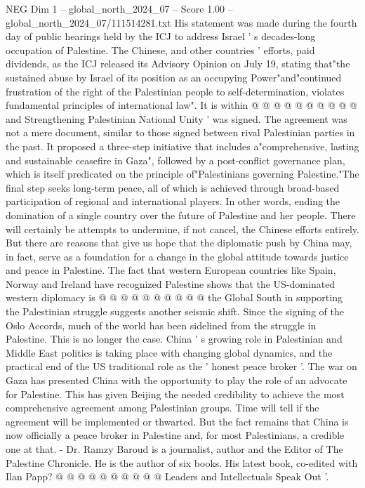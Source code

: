 \begin{textsample}{NEG Dim 1 – global\_north\_2024\_07 – Score 1.00 – global\_north\_2024\_07/111514281.txt}
His statement was made during the fourth day of public hearings held by the ICJ to address Israel ' s decades-long occupation of Palestine.
The Chinese, and other countries ' efforts, paid dividends, as the ICJ released its Advisory Opinion on July 19, stating that"the sustained abuse by Israel of its position as an occupying Power"and"continued frustration of the right of the Palestinian people to self-determination, violates fundamental principles of international law".
It is within @ @ @ @ @ @ @ @ @ @ and Strengthening Palestinian National Unity ' was signed.
The agreement was not a mere document, similar to those signed between rival Palestinian parties in the past.
It proposed a three-step initiative that includes a"comprehensive, lasting and sustainable ceasefire in Gaza", followed by a post-conflict governance plan, which is itself predicated on the principle of"Palestinians governing Palestine."The final step seeks long-term peace, all of which is achieved through broad-based participation of regional and international players.
In other words, ending the domination of a single country over the future of Palestine and her people.
There will certainly be attempts to undermine, if not cancel, the Chinese efforts entirely.
But there are reasons that give us hope that the diplomatic push by China may, in fact, serve as a foundation for a change in the global attitude towards justice and peace in Palestine.
The fact that western European countries like Spain, Norway and Ireland have recognized Palestine shows that the US-dominated western diplomacy is @ @ @ @ @ @ @ @ @ @ the Global South in supporting the Palestinian struggle suggests another seismic shift.
Since the signing of the Oslo Accords, much of the world has been sidelined from the struggle in Palestine.
This is no longer the case.
China ' s growing role in Palestinian and Middle East politics is taking place with changing global dynamics, and the practical end of the US traditional role as the ' honest peace broker '.
The war on Gaza has presented China with the opportunity to play the role of an advocate for Palestine.
This has given Beijing the needed credibility to achieve the most comprehensive agreement among Palestinian groups.
Time will tell if the agreement will be implemented or thwarted.
But the fact remains that China is now officially a peace broker in Palestine and, for most Palestinians, a credible one at that. - Dr.
Ramzy Baroud is a journalist, author and the Editor of The Palestine Chronicle.
He is the author of six books.
His latest book, co-edited with Ilan Papp? @ @ @ @ @ @ @ @ @ @ Leaders and Intellectuals Speak Out '.

\end{textsample}
